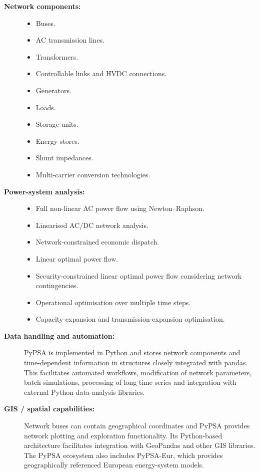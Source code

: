 \begin{description}
    \item[\textbf{Network components:}] \hfill
    \begin{itemize}
        \item Buses.
        \item AC transmission lines.
        \item Transformers.
        \item Controllable links and HVDC connections.
        \item Generators.
        \item Loads.
        \item Storage units.
        \item Energy stores.
        \item Shunt impedances.
        \item Multi-carrier conversion technologies.
    \end{itemize}

    \item[\textbf{Power-system analysis:}] \hfill
    \begin{itemize}
        \item Full non-linear AC power flow using Newton--Raphson.
        \item Linearised AC/DC network analysis.
        \item Network-constrained economic dispatch.
        \item Linear optimal power flow.
        \item Security-constrained linear optimal power flow considering
        network contingencies.
        \item Operational optimisation over multiple time steps.
        \item Capacity-expansion and transmission-expansion optimisation.
    \end{itemize}

    \item[\textbf{Data handling and automation:}]
    PyPSA is implemented in Python and stores network components and
    time-dependent information in structures closely integrated with pandas.
    This facilitates automated workflows, modification of network parameters,
    batch simulations, processing of long time series and integration with
    external Python data-analysis libraries.

    \item[\textbf{GIS / spatial capabilities:}]
    Network buses can contain geographical coordinates and PyPSA provides
    network plotting and exploration functionality. Its Python-based
    architecture facilitates integration with GeoPandas and other GIS
    libraries. The PyPSA ecosystem also includes PyPSA-Eur, which provides
    geographically referenced European energy-system models.


\end{description}
